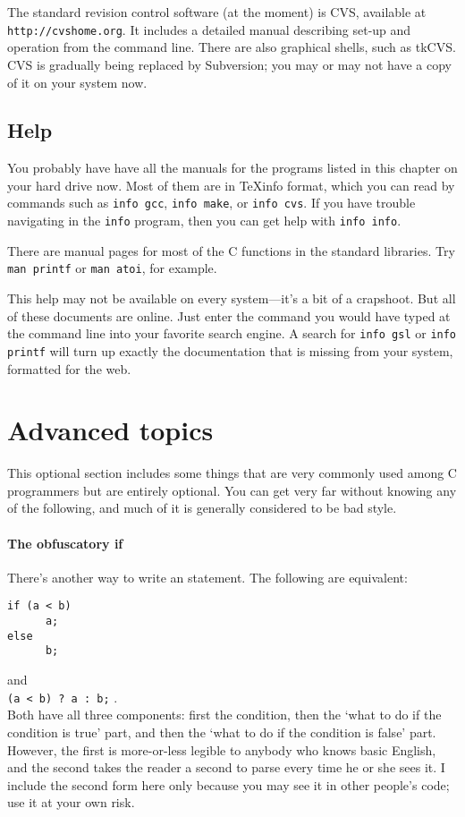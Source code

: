 \documentclass[12pt]{article}
\makeatletter
\def\ttind#1{\index{#1@{\tt #1}}{\tt #1}}
\makeatother
\begin{document}
The standard revision control software (at the moment) is CVS, available at {\tt
http://cvshome.org}. It includes a detailed manual describing set-up and
operation from the command line. There are also graphical shells, such as tkCVS.
CVS is gradually being replaced by Subversion; you may or may not have a copy of
it on your system now.

\subsection{Help} 
You probably have have all the manuals for the programs listed in this
chapter on your hard drive now. Most of them are in \TeX info format,
which you can read by commands such as {\tt info gcc}, {\tt info make},
or {\tt info cvs}. If you have trouble navigating in the {\tt info}
program, then you can get help with {\tt info info}.

There are manual pages for most of the C functions in the standard libraries. Try
{\tt man printf} or {\tt man atoi}, for example.

This help may not be available on every system---it's a bit of
a crapshoot. But all of these documents are online. Just enter the
command you would have typed at the command line into your favorite
search engine. A search for {\tt info gsl} or {\tt info printf} will
turn up exactly the documentation that is missing from your system,
formatted for the web.

\section{Advanced topics}
This optional section includes some things that are very commonly used among
C programmers but are entirely optional. You can get very far without
knowing any of the following, and much of it is generally considered to
be bad style.

\paragraph{The obfuscatory if} There's another way to write an \ttind{if} statement. The following are equivalent:
\begin{verbatim}
if (a < b)
      a;
else
      b;
\end{verbatim}
and\\ 
{\tt (a < b) ? a : b;} .\\
Both have all three components: first the condition, then the `what to do if the
condition is true' part, and then the `what to do if the condition is false'
part. However, the first is more-or-less legible to anybody who knows basic English,
and the second takes the reader a second to parse every time he or she
sees it. I include the second form here only because you may see it in
other people's code; use it at your own risk.
\end{document}
